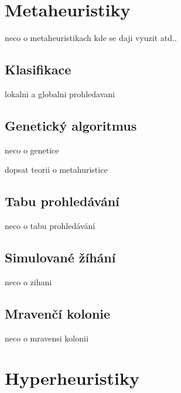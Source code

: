 \section{Metaheuristiky}
neco o metaheuristikach kde se daji vyuzit atd..

\subsection{Klasifikace}
lokalni a globalni prohledavani

\subsection{Genetický algoritmus}
neco o genetice

dopsat teorii o metahuristice

\subsection{Tabu prohledávání}
neco o tabu prohledávání

\subsection{Simulované žíhání}
neco o zihani

\subsection{Mravenčí kolonie}
neco o mravensi kolonii


\section{Hyperheuristiky}

